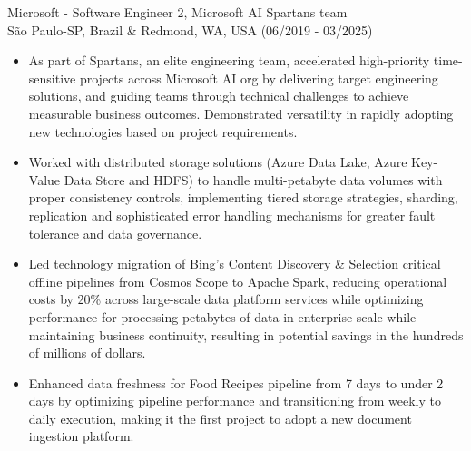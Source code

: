 
\normalsize{Microsoft - Software Engineer 2, Microsoft AI Spartans team}\\
    \scriptsize{São Paulo-SP, Brazil \& Redmond, WA, USA (06/2019 - 03/2025)}
\begin{itemize}
    \item \scriptsize{As part of Spartans, an elite engineering team, accelerated high-priority
        time-sensitive projects across Microsoft AI org by delivering target engineering solutions, and
        guiding teams through technical challenges to achieve measurable business outcomes. Demonstrated
        versatility in rapidly adopting new technologies based on project requirements.}

    \item \scriptsize{Worked with distributed storage solutions (Azure Data Lake, Azure Key-Value Data
        Store and HDFS) to handle multi-petabyte data volumes with proper consistency controls,
        implementing tiered storage strategies, sharding, replication and sophisticated error handling
        mechanisms for greater fault tolerance and data governance.}

    \item \scriptsize{Led technology migration of Bing's Content Discovery \& Selection critical offline
        pipelines from Cosmos Scope to Apache Spark, reducing operational costs by 20\% across
        large-scale data platform services while optimizing performance for processing petabytes of data 
        in enterprise-scale while maintaining business continuity, resulting in potential savings
        in the hundreds of millions of dollars.}

    \item \scriptsize{Enhanced data freshness for Food Recipes pipeline from 7 days to under 2 days by
        optimizing pipeline performance and transitioning from weekly to daily execution, making it the
        first project to adopt a new document ingestion platform.}


\end{itemize}
